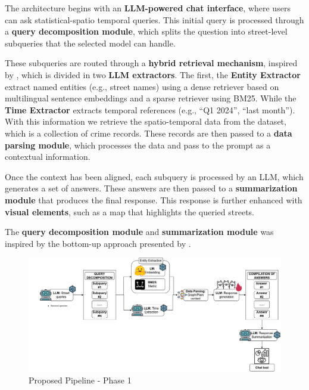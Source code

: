 The architecture begins with an \textbf{LLM-powered chat interface}, where users can ask statistical-spatio temporal queries. This initial query is processed through a \textbf{query decomposition module}, which splits the question into street-level subqueries that the selected model can handle.

These subqueries are routed through a \textbf{hybrid retrieval mechanism}, inspired by \cite{Guo2024LightRAG}, which is divided in two \textbf{LLM extractors}. The first, the \textbf{Entity Extractor} extract named entities (e.g., street names) using a dense retriever based on multilingual sentence embeddings and a sparse retriever using BM25. While the \textbf{Time Extractor} extracts temporal references (e.g., “Q1 2024”, “last month”). With this information we retrieve the spatio-temporal data from the dataset, which is a collection of crime records. These records are then passed to a \textbf{data parsing module}, which processes the data and pass to the prompt as a contextual information. 

Once the context has been aligned, each subquery is processed by an LLM, which generates a set of answers. These answers are then passed to a \textbf{summarization module} that produces the final response. This response is further enhanced with \textbf{visual elements}, such as a map that highlights the queried streets.

The \textbf{query decomposition module} and \textbf{summarization module} was inspired by the bottom-up approach presented by \cite{Deng2025VisualChronicles}.

\begin{figure}[H]
    \centering
    \includegraphics[width=\textwidth]{images/PFC3.drawio.png}
    \caption{Proposed Pipeline - Phase 1}
    \label{fig:proposal_f1}
\end{figure}

